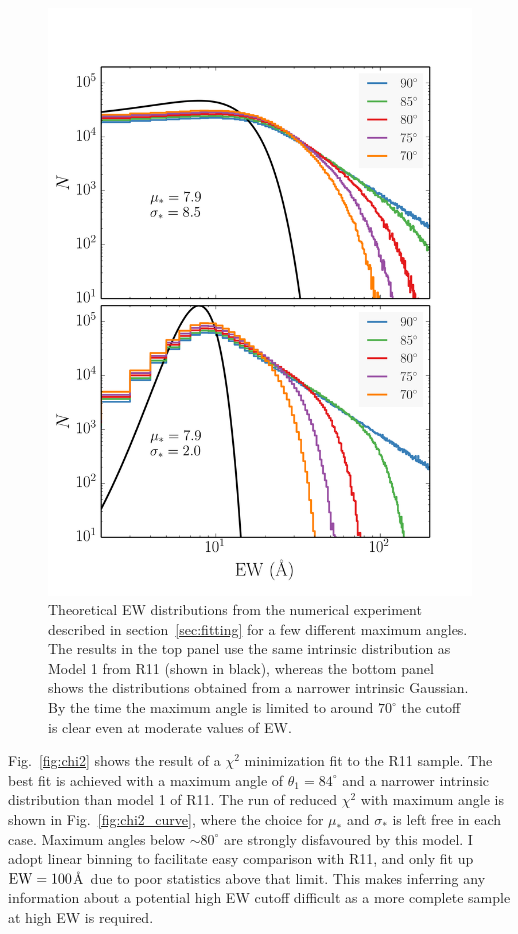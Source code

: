 \begin{figure}
\centering
\includegraphics[width=1.0\textwidth]{figures/ewpaper/cutoff.png}
\caption
{
Theoretical EW distributions from the numerical experiment 
described in section~\ref{sec:fitting} for a few different 
maximum angles. The results in the top panel use the same intrinsic
distribution as Model 1 from R11 (shown in black), 
whereas the bottom panel shows the distributions 
obtained from a narrower intrinsic Gaussian. By the time the maximum
angle is limited to around $70^\circ$ the cutoff is
clear even at moderate values of EW.
}
\label{fig:cutoff}
\end{figure}

Fig.~\ref{fig:chi2} shows the result of a $\chi^2$ minimization fit 
to the R11 sample. The best fit is achieved with a maximum angle of 
$\theta_{1}=84^\circ$ and a narrower intrinsic distribution
than model 1 of R11. The run of reduced $\chi^2$ with maximum angle
is shown in Fig.~\ref{fig:chi2_curve}, where the choice for $\mu_*$
and $\sigma_*$ is left free in each case. 
Maximum angles below $\sim80^\circ$ are strongly disfavoured
by this model. I adopt linear binning to facilitate easy comparison 
with R11, and only fit up ${\rm EW}=100$\AA\
due to poor statistics above that limit. This 
makes inferring any information about a potential high EW cutoff 
difficult as a more complete sample at high EW is required. 


